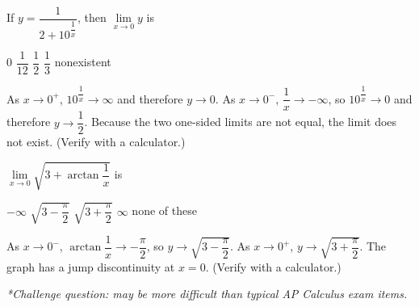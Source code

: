 \question
If $y=\dfrac{1}{2+10^{\dfrac{1}{x}}}$, then $\lim\limits_{x \to 0} y$ is
\begin{choices}
  \choice $0$
  \choice $\dfrac{1}{12}$
  \choice $\dfrac{1}{2}$
  \choice $\dfrac{1}{3}$
  \CorrectChoice nonexistent
\end{choices}
\begin{solution}
As $x \rightarrow 0^{+}$, $10^{\dfrac{1}{x}} \rightarrow \infty$ and therefore $y \rightarrow 0$. As $x \rightarrow 0^{-}$, $\dfrac{1}{x} \rightarrow-\infty$, so $10^{\dfrac{1}{x}} \rightarrow 0$ and therefore $y \rightarrow \dfrac{1}{2}$. Because the two one-sided limits are not equal, the limit does not exist. (Verify with a calculator.)
\end{solution}

\question
$\lim\limits_{x \to 0} \sqrt{3+\arctan \dfrac{1}{x}}$ is
\begin{choices}
  \choice $-\infty$
  \choice $\sqrt{3-\dfrac{\pi}{2}}$
  \choice $\sqrt{3+\dfrac{\pi}{2}}$
  \choice $\infty$
  \CorrectChoice none of these
\end{choices}
\begin{solution}
As $x \rightarrow 0^{-}$, $\arctan \dfrac{1}{x} \rightarrow-\dfrac{\pi}{2}$, so $y \rightarrow \sqrt{3-\dfrac{\pi}{2}}$. As $x \rightarrow 0^{+}$, $y \rightarrow \sqrt{3+\dfrac{\pi}{2}}$. The graph has a jump discontinuity at $x=0$. (Verify with a calculator.)

\medskip
\noindent\textit{*Challenge question: may be more difficult than typical AP Calculus exam items.}
\end{solution}

